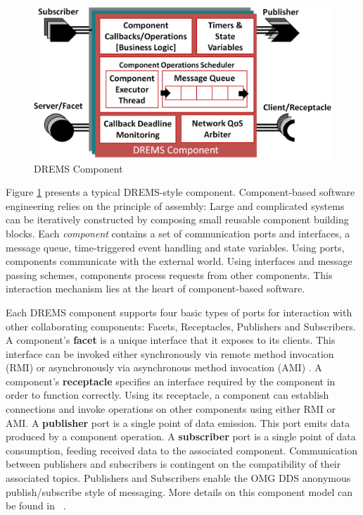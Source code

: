 \begin{figure}[h]
	\centering
	\includegraphics[width=\textwidth]{./figs/drems_component}
	\caption{DREMS Component}
	\label{fig:DREMS_Component}
	\vspace{-0.1in}
\end{figure}


Figure \ref{fig:DREMS_Component} presents a typical DREMS-style component. Component-based software engineering relies on the principle of assembly: Large and complicated systems can be iteratively constructed by composing small reusable component building blocks. Each \emph{component} contains a set of communication ports and interfaces, a message queue, time-triggered event handling and state variables. Using ports, components communicate with the external world. Using interfaces and message passing schemes, components process requests from other components. This interaction mechanism lies at the heart of component-based software. 

Each DREMS component supports four basic types of ports for interaction with other collaborating components: Facets, Receptacles, Publishers and Subscribers. A component's {\bf facet} is a unique interface that it exposes to its clients. This interface can be invoked either synchronously via remote method invocation (RMI) or asynchronously via asynchronous method invocation (AMI) \cite{waldo1998remote, raje1997asynchronous}. A component's {\bf receptacle} specifies an interface required by the component in order to function correctly. Using its receptacle, a component can establish connections and invoke operations on other components using either RMI or AMI. A {\bf publisher} port is a single point of data emission. This port emits data produced by a component operation. A {\bf subscriber} port is a single point of data consumption, feeding received data to the associated component. Communication between publishers and subscribers is contingent on the compatibility of their associated topics. Publishers and Subscribers enable the OMG DDS anonymous publish/subscribe \cite{eugster2003many} style of messaging. More details on this component model can be found in ~\cite{ISIS_F6_ISORC:13}.


